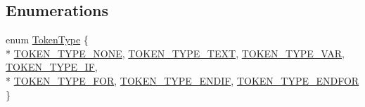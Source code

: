 \subsection*{Enumerations}
\begin{DoxyCompactItemize}
\item 
enum \hyperlink{namespacextd_1_1network_1_1http_1_1cpptempl_a39833083d228a5b5ef9f6bb7896479ee}{Token\-Type} \{ \\*
\hyperlink{namespacextd_1_1network_1_1http_1_1cpptempl_a39833083d228a5b5ef9f6bb7896479eeac2aec7f1ab8338419889ff04b8eb0f44}{T\-O\-K\-E\-N\-\_\-\-T\-Y\-P\-E\-\_\-\-N\-O\-N\-E}, 
\hyperlink{namespacextd_1_1network_1_1http_1_1cpptempl_a39833083d228a5b5ef9f6bb7896479eeaa3056860c42c00806c737551b598885c}{T\-O\-K\-E\-N\-\_\-\-T\-Y\-P\-E\-\_\-\-T\-E\-X\-T}, 
\hyperlink{namespacextd_1_1network_1_1http_1_1cpptempl_a39833083d228a5b5ef9f6bb7896479eea0e5df4476507663b07b952aefc096a86}{T\-O\-K\-E\-N\-\_\-\-T\-Y\-P\-E\-\_\-\-V\-A\-R}, 
\hyperlink{namespacextd_1_1network_1_1http_1_1cpptempl_a39833083d228a5b5ef9f6bb7896479eea63ca41e19f481129f654b675913cc557}{T\-O\-K\-E\-N\-\_\-\-T\-Y\-P\-E\-\_\-\-I\-F}, 
\\*
\hyperlink{namespacextd_1_1network_1_1http_1_1cpptempl_a39833083d228a5b5ef9f6bb7896479eea77914f6881c1bc9ec1910ca843bb6965}{T\-O\-K\-E\-N\-\_\-\-T\-Y\-P\-E\-\_\-\-F\-O\-R}, 
\hyperlink{namespacextd_1_1network_1_1http_1_1cpptempl_a39833083d228a5b5ef9f6bb7896479eea20879254cae890cea9ab4fbdb6223165}{T\-O\-K\-E\-N\-\_\-\-T\-Y\-P\-E\-\_\-\-E\-N\-D\-I\-F}, 
\hyperlink{namespacextd_1_1network_1_1http_1_1cpptempl_a39833083d228a5b5ef9f6bb7896479eea7a23df3b1f7078c58e56a3c51c24948c}{T\-O\-K\-E\-N\-\_\-\-T\-Y\-P\-E\-\_\-\-E\-N\-D\-F\-O\-R}
 \}
\end{DoxyCompactItemize}
